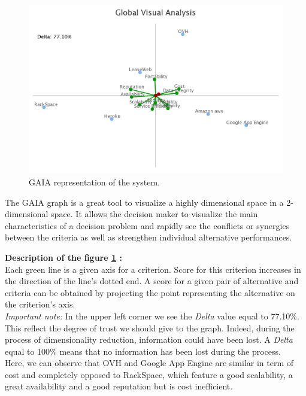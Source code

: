 \documentclass[a4paper,11pt]{article}
\begin{document}
\begin{figure}
\centering
  \includegraphics[width=\textwidth]{img/Result/gaia_plane.png}
\caption{GAIA representation of the system.}
  \label{fig:gaia}
\end{figure}

The GAIA graph is a great tool to visualize a highly dimensional space in a 2-dimensional space. It allows the decision maker to visualize the main characteristics of a decision problem and rapidly see the conflicts or synergies between the criteria as well as strengthen individual alternative performances.

\textbf{Description of the figure \ref{fig:gaia} :}\\

Each green line is a given axis for a criterion. Score for this criterion increases in the direction of the line's dotted end. A score for a given pair of alternative and criteria can be obtained by projecting the point representing the alternative on the criterion's axis. \\

\emph{Important note: } In the upper left corner we see the \textit{Delta} value equal to 77.10\%. This reflect the degree of trust we should give to the graph. Indeed, during the process of dimensionality reduction, information could have been lost. A \textit{Delta} equal to 100\% means that no information has been lost during the process.\\

Here, we can observe that OVH and Google App Engine are similar in term of cost and completely opposed to RackSpace, which feature a good scalability, a great availability and a good reputation but is cost inefficient. \\
\end{document}
